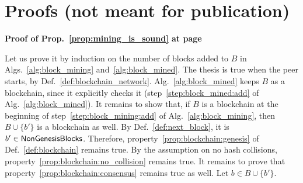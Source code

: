 \newpage

\appendix
\section{Proofs (not meant for publication)}

\noindent
\textbf{Proof of Prop.~\ref{prop:mining_is_sound} at page~\pageref{prop:mining_is_sound}}

\noindent
  Let us prove it by induction on the number of blocks added to $B$ in Algs.~\ref{alg:block_mining}
  and~\ref{alg:block_mined}. The thesis is true when the peer starts,
  by Def.~\ref{def:blockchain_network}. Alg.~\ref{alg:block_mined} keeps $B$
  as a blockchain, since it explicitly checks it (step~\ref{step:block_mined:add} of
  Alg.~\ref{alg:block_mined}). It remains to show that, if $B$ is a blockchain at the beginning
  of step~\ref{step:block_mining:add} of Alg.~\ref{alg:block_mining}, then $B\cup\{b'\}$ is a
  blockchain as well. By Def.~\ref{def:next_block}, it is $b'\in{\mathsf{NonGenesisBlocks}}$.
  Therefore, property~\ref{prop:blockchain:genesis} of Def.~\ref{def:blockchain} remains true.
  By the assumption on no hash collisions, property~\ref{prop:blockchain:no_collision} remains true.
  It remains to prove that property~\ref{prop:blockchain:consensus} remains true as well.
  Let $b\in B\cup\{b'\}$.
